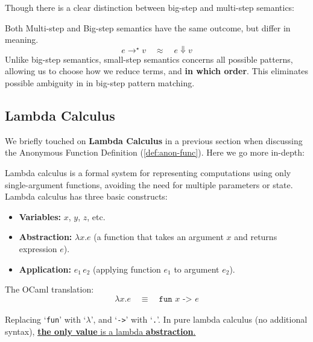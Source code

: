 \newpage 

\noindent
Though there is a clear distinction between big-step and multi-step semantics:

\begin{theo}

    Both Multi-step and Big-step semantics have the same outcome, but differ in meaning.
    \Large
    \[
      e \rightarrow^\star v \quad \approx \quad e \Downarrow v
    \]
    \normalsize
    Unlike big-step semantics, small-step semantics concerns all possible patterns, allowing us to choose how we reduce terms, and \textbf{in which order}. This eliminates possible ambiguity in
    in big-step pattern matching.
\end{theo}
  
\subsection{Lambda Calculus}

\noindent
We briefly touched on \textbf{Lambda Calculus} in a previous section when discussing the Anonymous Function Definition (\ref{def:anon-func}). Here
we go more in-depth:

\begin{Def}

    Lambda calculus is a formal system for representing computations using only single-argument functions, avoiding the need for multiple parameters or state. Lambda calculus has three basic constructs:
    \begin{itemize}
      \item \textbf{Variables:} \(x\), \(y\), \(z\), etc.
      \item \textbf{Abstraction:} \(\lambda x. e\) (a function that takes an argument \(x\) and returns expression \(e\)).
      \item \textbf{Application:} \(e_1\, e_2\) (applying function \(e_1\) to argument \(e_2\)).
    \end{itemize}
  
    \noindent
    The OCaml translation:
    \LARGE
    \[
        \lambda x. e \quad \equiv \quad \texttt{fun } x \texttt{ -> } e
    \]\\
    \normalsize
    \noindent
    Replacing `\texttt{fun}' with `$\lambda$', and `\texttt{->}' with `\texttt{.}'. 
    In pure lambda calculus (no additional syntax), \underline{\textbf{the only value} is a lambda \textbf{abstraction}.}
  \end{Def}
  
